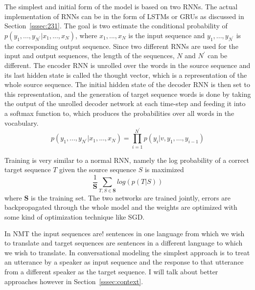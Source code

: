 \documentclass[12pt]{article}
\begin{document}
The simplest and initial form of the model is based on two RNNs. The actual implementation of RNNs can be in the form of LSTMs or GRUs as discussed in Section~\ref{sssec:231}. The goal is two estimate the conditional probability of \(p(y_1,...,y_{N^{'}}|x_1,...,x_N)\), where \(x_1,...,x_N\) is the input sequence and \(y_1,...,y_{N^{'}}\) is the corresponding output sequence. Since two different RNNs are used for the input and output sequences, the length of the sequences, \(N\) and \(N^{'}\) can be different. The encoder RNN is unrolled over the words in the source sequence and its last hidden state is called the thought vector, which is a representation of the whole source sequence. The initial hidden state of the decoder RNN is then set to this representation, and the generation of target sequence words is done by taking the output of the unrolled decoder network at each time-step and feeding it into a softmax function to, which produces the probabilities over all words in the vocabulary.
\begin{equation} \label{eq232a}
p(y_1,...,y_{N^{'}}|x_1,...,x_N)=\prod_{i=1}^{N^{'}}p(y_i|v,y_1,...,y_{i-1})
\end{equation}

Training is very similar to a normal RNN, namely the log probability of a correct target sequence \(T\) given the source sequence \(S\) is maximized
\begin{equation} \label{eq232b}
\frac{1}{\bm{S}}\sum_{T,S \in \bm{S}}log(p(T|S))
\end{equation}
where \(\bm{S}\) is the training set. The two networks are trained jointly, errors are backpropagated through the whole model and the weights are optimized with some kind of optimization technique like SGD.

In NMT the input sequences are! sentences in one language from which we wish to translate and target sequences are sentences in a different language to which we wish to translate. In conversational modeling the simplest approach is to treat an utterance by a speaker as input sequence and the response to that utterance from a different speaker as the target sequence. I will talk about better approaches however in Section~\ref{sssec:context}.
\end{document}
